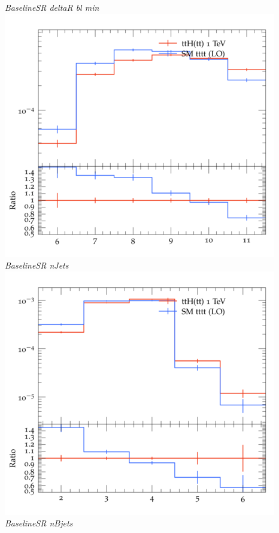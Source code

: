 \documentclass{beamer}
\begin{document}
\begin{frame}
\begin{columns}
\textit{\small BaselineSR deltaR bl min}
\includegraphics[width=\textwidth]{../plots/ttH_1000/tttt_ttH_1LOS/BaselineSR_nJets.png}\\
\textit{\small BaselineSR nJets}
\includegraphics[width=\textwidth]{../plots/ttH_1000/tttt_ttH_1LOS/BaselineSR_nBjets.png}\\
\textit{\small BaselineSR nBjets}
\end{columns}
\end{frame}
\end{document}
